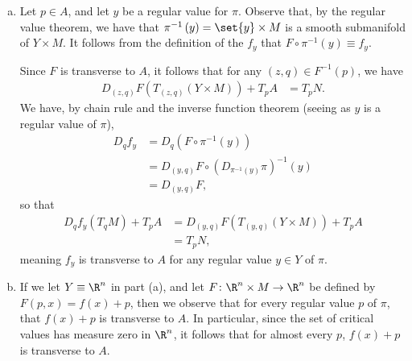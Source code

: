 \documentclass[10pt]{mypackage}
\begin{document}
\begin{solution}\hfill
  \begin{enumerate}[(a)]
    \item Let $p\in A$, and let $y$ be a regular value for $\pi$. Observe that, by the regular value theorem, we have that $\pi^{-1}\left( y \right) = \set{y}\times M$ is a smooth submanifold of $Y\times M$. It follows from the definition of the $f_y$ that $F\circ \pi^{-1}\left( y \right) \equiv f_y$.\newline

      Since $F$ is transverse to $A$, it follows that for any $\left( z,q \right)\in F^{-1}\left( p \right)$, we have
      \begin{align*}
        D_{(z,q)}F\left( T_{(z,q)}\left( Y\times M \right) \right) + T_pA &= T_pN.
      \end{align*}
      We have, by chain rule and the inverse function theorem (seeing as $y$ is a regular value of $\pi$),
      \begin{align*}
        D_qf_y &= D_q\left( F\circ\pi^{-1}(y) \right)\\
               &= D_{(y,q)}F\circ \left( D_{\pi^{-1}(y)}\pi \right)^{-1}(y)\\
               &= D_{(y,q)}F,
      \end{align*}
      so that
      \begin{align*}
        D_qf_y\left( T_{q}M \right) + T_pA &= D_{(y,q)}F\left( T_{(y,q)}\left( Y\times M \right) \right) + T_pA\\
                                           &= T_pN,
      \end{align*}
      meaning $f_y$ is transverse to $A$ for any regular value $y\in Y$ of $\pi$.
    \item If we let $Y \equiv \R^{n}$ in part (a), and let $F\colon \R^{n}\times M \rightarrow \R^{n}$ be defined by $F\left( p,x \right) = f(x) + p$, then we observe that for every regular value $p$ of $\pi$, that $f(x) + p$ is transverse to $A$. In particular, since the set of critical values has measure zero in $\R^{n}$, it follows that for almost every $p$, $f(x) + p$ is transverse to $A$.
  \end{enumerate}
\end{solution}
\end{document}
